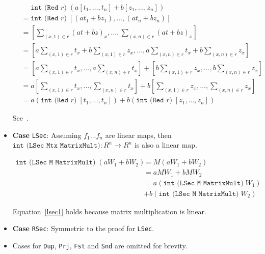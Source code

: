 \begin{itemize}
\begin{align}
  &\phantom{=} \texttt{int (Red $r$)}\; (a[t_1,\dots,t_n] + b[z_1,\ldots,z_n]) \\
  &= \texttt{int (Red $r$)}\; [(a t_1 + b z_1), \ldots, (a t_n + b z_n)] \\
  &= \left[
    \sum_{(x,1)\in r} (at+bz)_x
    ,\ldots,
    \sum_{(x,n)\in r} (at+bz)_x
    \right] \\
  &= \left[
    a\sum_{(x,1)\in r} t_x
    +
    b\sum_{(x,1)\in r} z_x
    ,\ldots,
    a\sum_{(x,n)\in r} t_x
    +
    b\sum_{(x,n)\in r} z_x
    \right]
    \\
  &= \left[
    a\sum_{(x,1)\in r} t_x
    ,\ldots,
    a\sum_{(x,n)\in r} t_x
    \right]
  +
    \left[
    b\sum_{(x,1)\in r} z_x
    ,\ldots,
    b\sum_{(x,n)\in r} z_x
    \right]
    \\
  &=a \left[
    \sum_{(x,1)\in r} t_x
    ,\ldots,
    \sum_{(x,n)\in r} t_x
    \right]
  +
    b \left[
    \sum_{(x,1)\in r} z_x
    ,\ldots,
    \sum_{(x,n)\in r} z_x
    \right]
    \\
  &= a\left(\texttt{int (Red $r$)}\;  [t_1 ,\ldots, t_n ]\right) + b \left( \texttt{int (Red $r$)}\; [ z_1 ,\ldots, z_n]\right)
\end{align}

See~\cite[Proposition F.17 \texttt{red} is linear, p. 51]{popl}.


\item{\textbf{Case} \texttt{LSec}:}
Assuming $f_1 \ldots f_n$ are linear maps, then \( \texttt{int (LSec Mtx MatrixMult)} \colon R^n \rightarrow R^n\) is also a linear map.



\begin{align}
  \texttt{int (LSec M MatrixMult)}\; ( aW_1 + bW_2)
  &= M (a W_1 + b W_2)  \\
  &= aMW_1 + bMW_2  \label{lsec1} \\
  &= a\left( \texttt{int (LSec M MatrixMult)}\; W_1 \right) \\
  &+ b\left( \texttt{int (LSec M MatrixMult)}\; W_2 \right)
\end{align}

Equation~\eqref{lsec1} holds because matrix multiplication is linear.

\item{\textbf{Case} \texttt{RSec}:}
  Symmetric to the proof for \texttt{LSec}.

\item Cases for \texttt{Dup}, \texttt{Prj}, \texttt{Fst} and \texttt{Snd} are omitted for
  brevity. %

\end{itemize}
